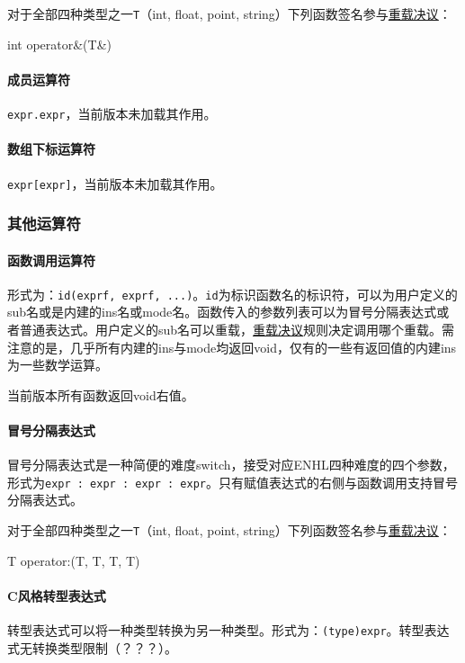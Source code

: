 \documentclass[UTF8]{ctexart}
\begin{document}
对于全部四种类型之一\verb|T|（int, float, point, string）下列函数签名参与\hyperref[chongzai]{重载决议}：
\begin{MUAvbt}
int operator&(T&)
\end{MUAvbt}

\paragraph{成员运算符} \verb|expr.expr|，当前版本未加载其作用。

\paragraph{数组下标运算符} \verb|expr[expr]|，当前版本未加载其作用。

\subsubsection{其他运算符}
\label{qita}

\paragraph{函数调用运算符} 形式为：\verb|id(exprf, exprf, ...)|。\verb|id|为标识函数名的标识符，可以为用户定义的sub名或是内建的ins名或mode名。函数传入的参数列表可以为冒号分隔表达式或者普通表达式。用户定义的sub名可以重载，\hyperref[chongzai]{重载决议}规则决定调用哪个重载。需注意的是，几乎所有内建的ins与mode均返回void，仅有的一些有返回值的内建ins为一些数学运算。

当前版本所有函数返回void右值。

\paragraph{冒号分隔表达式} 冒号分隔表达式是一种简便的难度switch，接受对应ENHL四种难度的四个参数，形式为\verb|expr : expr : expr : expr|。只有赋值表达式的右侧与函数调用支持冒号分隔表达式。

对于全部四种类型之一\verb|T|（int, float, point, string）下列函数签名参与\hyperref[chongzai]{重载决议}：
\begin{MUAvbt}
T operator:(T, T, T, T)
\end{MUAvbt}

\paragraph{C风格转型表达式} 转型表达式可以将一种类型转换为另一种类型。形式为：\verb|(type)expr|。转型表达式无转换类型限制（？？？）。
\end{document}
